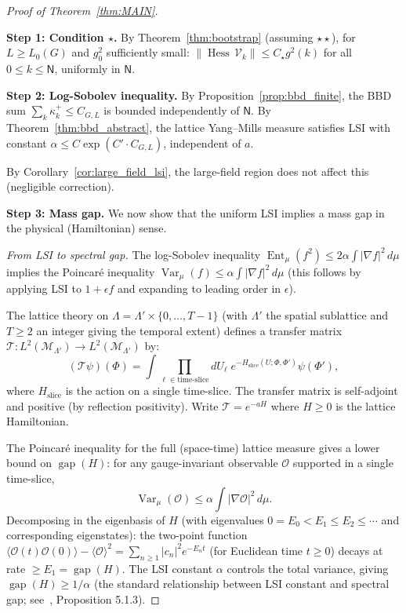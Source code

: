 \documentclass[11pt,a4paper]{article}
\theoremstyle{plain}
\theoremstyle{definition}
\theoremstyle{remark}
\newcommand{\Var}{\operatorname{Var}}
\newcommand{\Ent}{\operatorname{Ent}}
\newcommand{\Hess}{\operatorname{Hess}}
\newcommand{\cM}{\mathcal{M}}
\newcommand{\cV}{\mathcal{V}}
\newcommand{\cT}{\mathcal{T}}
\newcommand{\cO}{\mathcal{O}}
\DeclareMathOperator{\gap}{gap}
\begin{document}
\begin{proof}[Proof of Theorem~\ref{thm:MAIN}]
~

\medskip\noindent
\textbf{Step 1: Condition $\star$.}
By Theorem~\ref{thm:bootstrap} (assuming $\star\star$),
for $L \ge L_0(G)$ and $g_0^2$ sufficiently small:
$\|\Hess\,\cV_k\| \le C_\star g^2(k)$ for all
$0 \le k \le \mathsf{N}$, uniformly in $\mathsf{N}$.

\medskip\noindent
\textbf{Step 2: Log-Sobolev inequality.}
By Proposition~\ref{prop:bbd_finite}, the BBD sum
$\sum_k \kappa_k^+ \le C_{G,L}$ is bounded independently
of $\mathsf{N}$. By Theorem~\ref{thm:bbd_abstract}, the lattice
Yang--Mills measure satisfies LSI with constant
$\alpha \le C \exp(C' \cdot C_{G,L})$, independent of $a$.

By Corollary~\ref{cor:large_field_lsi}, the large-field
region does not affect this (negligible correction).

\medskip\noindent
\textbf{Step 3: Mass gap.}
We now show that the uniform LSI implies a mass gap in
the physical (Hamiltonian) sense.

\emph{From LSI to spectral gap.}
The log-Sobolev inequality
$\Ent_\mu(f^2) \le 2\alpha\int|\nabla f|^2\,d\mu$
implies the Poincar\'e inequality
$\Var_\mu(f) \le \alpha\int|\nabla f|^2\,d\mu$
(this follows by applying LSI to $1 + \epsilon f$ and
expanding to leading order in $\epsilon$).

The lattice theory on $\Lambda = \Lambda' \times \{0,
\ldots, T-1\}$ (with $\Lambda'$ the spatial sublattice and
$T \ge 2$ an integer giving the temporal extent) defines a transfer matrix
$\cT : L^2(\cM_{\Lambda'}) \to L^2(\cM_{\Lambda'})$ by:
\begin{equation}
  (\cT\psi)(\Phi) = \int \prod_{\ell \in \text{time-slice}}
  dU_\ell\; e^{-H_{\mathrm{slice}}(U;\Phi,\Phi')}
  \psi(\Phi'),
\end{equation}
where $H_{\mathrm{slice}}$ is the action on a single
time-slice. The transfer matrix is self-adjoint and
positive (by reflection positivity). Write
$\cT = e^{-aH}$ where $H \ge 0$ is the lattice
Hamiltonian.

The Poincar\'e inequality for the full (space-time) lattice
measure gives a lower bound on $\gap(H)$: for any
gauge-invariant observable $\cO$ supported in a single
time-slice,
\begin{equation}
  \Var_\mu(\cO) \le \alpha\int|\nabla\cO|^2\,d\mu.
\end{equation}
Decomposing in the eigenbasis of $H$
(with eigenvalues $0 = E_0 < E_1 \le E_2 \le \cdots$
and corresponding eigenstates):
the two-point
function $\langle\cO(t)\cO(0)\rangle - \langle\cO\rangle^2
= \sum_{n \ge 1} |c_n|^2 e^{-E_n t}$
(for Euclidean time $t \ge 0$) decays at rate
$\ge E_1 = \gap(H)$. The LSI constant $\alpha$ controls
the total variance, giving $\gap(H) \ge 1/\alpha$
(the standard relationship between LSI constant and
spectral gap; see~\cite{Ledoux}, Proposition 5.1.3).


\end{proof}
\end{document}
